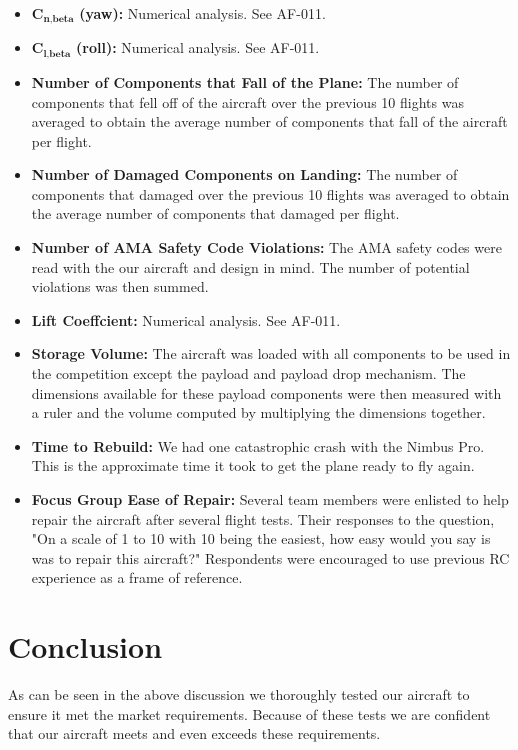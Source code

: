 \documentclass[]{auvsi_doc}
\begin{document}
\begin{itemize}
	\item $\textbf{C}_{\textbf{n,beta}}$ \textbf{(yaw):} Numerical analysis. See AF-011.
	\item $\textbf{C}_{\textbf{l,beta}}$ \textbf{(roll):} Numerical analysis. See AF-011.
	\item \textbf{Number of Components that Fall of the Plane:} The number of components that fell off of the aircraft over the previous 10 flights was averaged to obtain the average number of components that fall of the aircraft per flight. 
	\item \textbf{Number of Damaged Components on Landing:} The number of components that damaged over the previous 10 flights was averaged to obtain the average number of components that damaged per flight. 
	\item \textbf{Number of AMA Safety Code Violations:} The AMA safety codes were read with the our aircraft and design in mind. The number of potential violations was then summed.
	\item \textbf{Lift Coeffcient:} Numerical analysis. See AF-011.
	\item \textbf{Storage Volume:} The aircraft was loaded with all components to be used in the competition except the payload and payload drop mechanism. The dimensions available for these payload components were then measured with a ruler and the volume computed by multiplying the dimensions together. 
	\item \textbf{Time to Rebuild:} We had one catastrophic crash with the Nimbus Pro. This is the approximate time it took to get the plane ready to fly again.
	\item \textbf{Focus Group Ease of Repair:} Several team members were enlisted to help repair the aircraft after several flight tests. Their responses to the question, "On a scale of 1 to 10 with 10 being the easiest, how easy would you say is was to repair this aircraft?" Respondents were encouraged to use previous RC experience as a frame of reference.
\end{itemize} 

\section{Conclusion}
As can be seen in the above discussion we thoroughly tested our aircraft to ensure it met the market requirements. Because of these tests we are confident that our aircraft meets and even exceeds these requirements.
\end{document}
